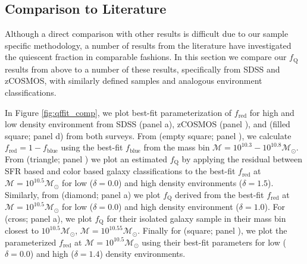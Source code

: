 \subsection{Comparison to Literature}
Although a direct comparison with other results is difficult due to
our sample specific methodology, a number of results from the literature have investigated the quiescent fraction in comparable fashions. In this section we compare our $f_{\mathrm{Q}}$ results from above to a number of these results, specifically from SDSS and zCOSMOS, with similarly defined samples and analogous environment classifications. 

In Figure \ref{fig:qffit_comp}, we plot  best-fit parameterization of
$f_{\mathrm{red}}$ for high and low density environment from SDSS (panel a), zCOSMOS (panel \iovinopanel), and \cite{Peng:2010aa} (filled square; panel d) from both surveys. 
From \cite{Iovino:2010aa} (empty square; panel \iovinopanel), we calculate $f_{\mathrm{red}} = 1-f_{\mathrm{blue}}$
using the best-fit $f_{\mathrm{blue}}$ from the mass bin $\mathcal{M} =
10^{10.3} - 10^{10.8} \mathcal{M}_{\odot}$. From \cite{Kovac:2014aa} (triangle; panel \kovacpanel)
we plot an estimated $f_{\mathrm{Q}}$ by applying the residual between SFR
based and color based galaxy classifications to the best-fit
$f_{\mathrm{red}}$ at $\mathcal{M} = 10^{10.5} \mathcal{M}_{\odot}$ for
low ($\delta = 0.0$) and high density environments ($\delta =
1.5$). Similarly, from \cite{Baldry:2006aa} (diamond; panel a) we plot $f_{\mathrm{Q}}$
derived from the best-fit $f_{\mathrm{red}}$ at $\mathcal{M} = 10^{10.5}
\mathcal{M}_{\odot}$ for low ($\delta = 0.0$) and high density
environment ($\delta = 1.0$). For \cite{geha12a} (cross; panel a), we plot $f_{\mathrm{Q}}$
for their isolated galaxy sample in their mass bin closest to $10^{10.5} \mathcal{M}_{\odot}$, $\mathcal{M} = 10^{10.55} \mathcal{M}_{\odot}$. Finally for \cite{Peng:2010aa} (square; panel \pengpanel), we plot the parameterized $f_{\mathrm{red}}$ at $\mathcal{M} = 10^{10.5} \mathcal{M}_{\odot}$ using their best-fit parameters for low ($\delta =0.0$) and high ($\delta = 1.4$) density environments. 

